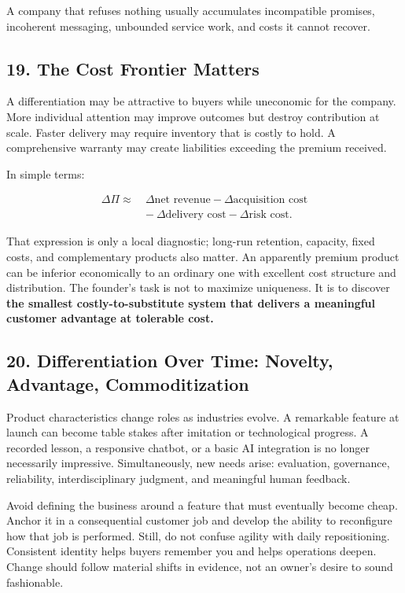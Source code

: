 A company that refuses nothing usually accumulates incompatible promises, incoherent messaging, unbounded service work, and costs it cannot recover.

\subsection*{19. The Cost Frontier Matters}

A differentiation may be attractive to buyers while uneconomic for the company. More individual attention may improve outcomes but destroy contribution at scale. Faster delivery may require inventory that is costly to hold. A comprehensive warranty may create liabilities exceeding the premium received.

In simple terms:

\begin{equation}
\begin{aligned}
\Delta \Pi \approx\ &\Delta \text{net revenue} - \Delta \text{acquisition cost} \\
&-\ \Delta \text{delivery cost} - \Delta \text{risk cost}.
\end{aligned}
\end{equation}

That expression is only a local diagnostic; long-run retention, capacity, fixed costs, and complementary products also matter. An apparently premium product can be inferior economically to an ordinary one with excellent cost structure and distribution. The founder's task is not to maximize uniqueness. It is to discover \textbf{the smallest costly-to-substitute system that delivers a meaningful customer advantage at tolerable cost.}

\subsection*{20. Differentiation Over Time: Novelty, Advantage, Commoditization}

Product characteristics change roles as industries evolve. A remarkable feature at launch can become table stakes after imitation or technological progress. A recorded lesson, a responsive chatbot, or a basic AI integration is no longer necessarily impressive. Simultaneously, new needs arise: evaluation, governance, reliability, interdisciplinary judgment, and meaningful human feedback.

Avoid defining the business around a feature that must eventually become cheap. Anchor it in a consequential customer job and develop the ability to reconfigure how that job is performed. Still, do not confuse agility with daily repositioning. Consistent identity helps buyers remember you and helps operations deepen. Change should follow material shifts in evidence, not an owner's desire to sound fashionable.

